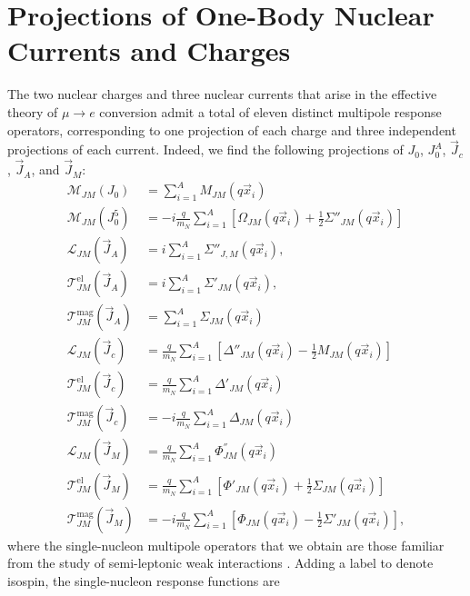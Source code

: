 \documentclass[12pt,letterpaper]{book}
\begin{document}
\section{Projections of One-Body Nuclear Currents and Charges}
\label{sec:single_nucleon_operators}
The two nuclear charges and three nuclear currents that arise in the effective theory of $\mu\rightarrow e$ conversion admit a total of eleven distinct multipole response operators, corresponding to one projection of each charge and three independent projections of each current. Indeed, we find the following projections of $J_0$, $J_0^A$, $\vec{J}_c$, $\vec{J}_A$, and $\vec{J}_M$:
\begin{equation}
\begin{split}
\mathcal{M}_{JM}(J_0)&=\sum_{i=1}^AM_{JM}(q\vec{x}_i)\\
\mathcal{M}_{JM}(J^5_0)&=-i\frac{q}{m_N}\sum_{i=1}^A \left[\Omega_{JM}(q\vec{x}_i)+\frac{1}{2}\Sigma''_{JM}(q\vec{x}_i)\right]\\
\mathcal{L}_{JM}(\vec{J}_A)&=i\sum_{i=1}^A\Sigma''_{J,M}(q\vec{x}_i),\\
\mathcal{T}^{\mathrm{el}}_{JM}(\vec{J}_A)&=i\sum_{i=1}^A\Sigma'_{JM}(q\vec{x}_i),\\
\mathcal{T}^{\mathrm{mag}}_{JM}(\vec{J}_A)&=\sum_{i=1}^A\Sigma_{JM}(q\vec{x}_i)\\
\mathcal{L}_{JM}(\vec{J}_c)&=\frac{q}{m_N}\sum_{i=1}^A \left[\Delta''_{JM}(q\vec{x}_i)-\frac{1}{2}M_{JM}(q\vec{x}_i)\right]\\
\mathcal{T}^{\mathrm{el}}_{JM}(\vec{J}_c)&=\frac{q}{m_N}\sum_{i=1}^A\Delta'_{JM}(q\vec{x}_i)\\
\mathcal{T}^{\mathrm{mag}}_{JM}(\vec{J}_c)&=-i\frac{q}{m_N}\sum_{i=1}^A\Delta_{JM}(q\vec{x}_i)\\
\mathcal{L}_{JM}(\vec{J}_M)&=\frac{q}{m_N}\sum_{i=1}^A\Phi^{''}_{JM}(q\vec{x}_i)\\
\mathcal{T}^{\mathrm{el}}_{JM}(\vec{J}_M)&=\frac{q}{m_N}\sum_{i=1}^A\left[\Phi'_{JM}(q\vec{x}_i)+\frac{1}{2}\Sigma_{JM}(q\vec{x}_i)\right]\\
\mathcal{T}^{\mathrm{mag}}_{JM}(\vec{J}_M)&=-i\frac{q}{m_N}\sum_{i=1}^A\left[\Phi_{JM}(q\vec{x}_i)-\frac{1}{2}\Sigma'_{JM}(q\vec{x}_i)\right],
\end{split}
\end{equation}
where the single-nucleon multipole operators that we obtain are those familiar from the study of semi-leptonic weak interactions \cite{DONNELLY1979103,SEROT1979408}. Adding a label to denote isospin, the single-nucleon response functions are
\end{document}
